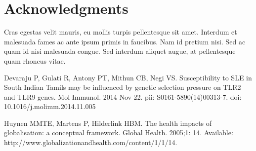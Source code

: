\documentclass[10pt,letterpaper]{article}
\begin{document}
\section*{Acknowledgments}
Cras egestas velit mauris, eu mollis turpis pellentesque sit amet. Interdum et
malesuada fames ac ante ipsum primis in faucibus. Nam id pretium nisi. Sed ac
quam id nisi malesuada congue. Sed interdum aliquet augue, at pellentesque quam
rhoncus vitae.

\nolinenumbers

%
%
% 
\begin{thebibliography}{10}
Devaraju P, Gulati R, Antony PT, Mithun CB, Negi VS. Susceptibility to SLE in
South Indian Tamils may be influenced by genetic selection pressure on TLR2 and
TLR9 genes. Mol Immunol. 2014 Nov 22. pii: S0161-5890(14)00313-7. doi:
10.1016/j.molimm.2014.11.005

Huynen MMTE, Martens P, Hilderlink HBM. The health impacts of globalisation: a
conceptual framework. Global Health. 2005;1: 14. Available:
http://www.globalizationandhealth.com/content/1/1/14.

\end{thebibliography}
\end{document}
